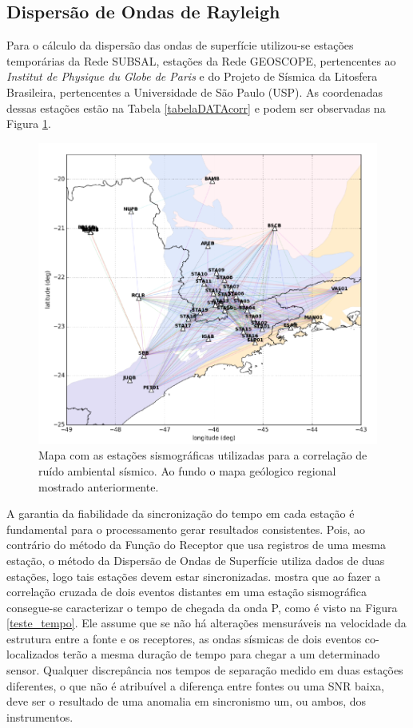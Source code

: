 \subsection{Dispersão de Ondas de Rayleigh}

Para o cálculo da dispersão das ondas de superfície utilizou-se estações temporárias da Rede SUBSAL, estações da Rede GEOSCOPE, pertencentes ao \textit{Institut de Physique du Globe de Paris} e do Projeto de Sísmica  da Litosfera Brasileira, pertencentes a Universidade de São Paulo (USP). As coordenadas dessas estações estão na Tabela \ref{tabelaDATAcorr} e podem ser observadas na Figura \ref{STA_corr}.

\begin{figure}[!ht]
\centering
\includegraphics[scale=0.5]{Figs/sta_corr.png}
\caption{Mapa com as estações sismográficas utilizadas para a correlação de ruído ambiental sísmico. Ao fundo o mapa geólogico regional mostrado anteriormente.}
\label{STA_corr}
\end{figure}

A garantia da fiabilidade da sincronização do tempo em cada estação é fundamental para o processamento gerar resultados consistentes. Pois, ao contrário do método da Função do Receptor que usa registros de uma mesma estação, o método da Dispersão de Ondas de Superfície utiliza dados de duas estações, logo tais estações devem estar sincronizadas. \cite{gibbons_identification_2006} mostra que ao fazer a correlação cruzada de dois eventos distantes em uma estação sismográfica consegue-se caracterizar o tempo de chegada da onda P, como é visto na Figura \ref{teste_tempo}. Ele assume que se não há alterações mensuráveis na velocidade da estrutura entre a fonte e os receptores, as ondas sísmicas de dois eventos co-localizados terão a mesma duração de tempo para chegar a um determinado sensor. Qualquer discrepância nos tempos de separação medido em duas estações diferentes, o que não é atribuível a diferença entre fontes ou uma SNR baixa, deve ser o resultado de uma anomalia em sincronismo um, ou ambos, dos instrumentos.

